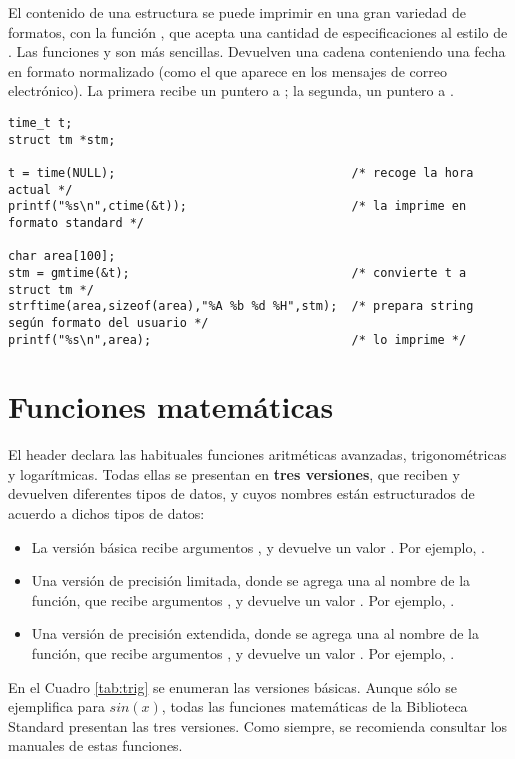 El contenido de una estructura  se puede imprimir en una gran variedad de
formatos, con la función , que acepta una cantidad de especificaciones
al estilo de . Las funciones  y  son más sencillas.
Devuelven una cadena conteniendo una fecha en formato normalizado (como el que
aparece en los mensajes de correo electrónico). La primera recibe un puntero a
; la segunda, un puntero a .

\begin{ejemplo}
\begin{lstlisting}
time_t t;
struct tm *stm;

t = time(NULL);                                 /* recoge la hora actual */
printf("%s\n",ctime(&t));                       /* la imprime en formato standard */

char area[100];
stm = gmtime(&t);                               /* convierte t a struct tm */
strftime(area,sizeof(area),"%A %b %d %H",stm);  /* prepara string según formato del usuario */
printf("%s\n",area);                            /* lo imprime */
\end{lstlisting}
\end{ejemplo}

\section{Funciones matemáticas}
El header  declara las habituales funciones aritméticas avanzadas,
trigonométricas y logarítmicas. Todas ellas se presentan en \textbf{tres versiones}, que reciben y devuelven diferentes tipos de datos, y cuyos nombres están estructurados de acuerdo a dichos tipos de datos:
\begin{itemize}
	\item La versión básica recibe argumentos , y devuelve un valor . Por ejemplo, .
	\item Una versión de precisión limitada, donde se agrega una  al nombre de la función, que  recibe argumentos , y devuelve un valor . Por ejemplo, .
	\item Una versión de precisión extendida, donde se agrega una  al nombre de la función, que recibe argumentos , y devuelve un valor . Por ejemplo, .
\end{itemize}

En el Cuadro \ref{tab:trig} se enumeran las versiones básicas. Aunque sólo se ejemplifica para $sin(x)$, todas las funciones matemáticas de la Biblioteca Standard presentan las tres versiones. Como siempre, se recomienda consultar los manuales de estas funciones.

